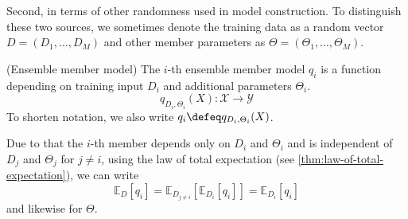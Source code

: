 \documentclass[
	twoside=false, %
]{kaobook}
\begin{document}
Second, in terms of other randomness used in model construction.
To distinguish these two sources, we sometimes denote the training data as a random vector $D = (D_{1}, \dots, D_{M})$ and other member parameters as $\Theta = (\Theta_{1}, \dots, \Theta_{M})$. 
\begin{definition} (Ensemble member model) The $i$-th ensemble member model $q_{i}$ is a function depending on training input $D_{i}$ and additional parameters $\Theta_{i}$.
$$
q_{D_{i}, \Theta_{i}}(X): \mathcal{X} \to \mathcal{Y}
$$
To shorten notation, we also write $q_{i} \defeq  q_{D_{i}, \Theta_{i}}(X)$.
\end{definition}
Due to that the $i$-th member depends only on $D_{i}$ and $\Theta_{i}$ and is independent of $D_{j}$ and $\Theta_{j}$ for $j \not= i$, using the law of total expectation (see \cref{thm:law-of-total-expectation}), we can write
$$
\mathbb{E}_{D}\left[ q_{i} \right] = \mathbb{E}_{D_{j \not= i}}\left[ \mathbb{E}_{D_{i}}\left[ q_{i} \right]   \right]  = \mathbb{E}_{D_{i}}\left[ q_{i} \right] 
$$
and likewise for $\Theta$. 
\end{document}
